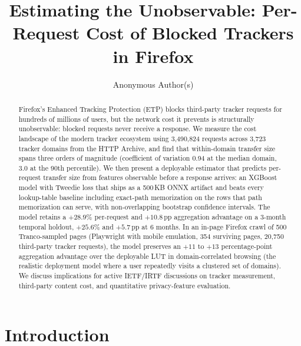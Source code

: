 \documentclass[10pt,sigconf,letterpaper,anonymous]{acmart}
\newcommand{\numrequests}{3{,}490{,}824\xspace}
\newcommand{\numdomains}{3{,}723\xspace}
\begin{document}
\title{Estimating the Unobservable: Per-Request Cost of Blocked Trackers in Firefox}

\author{Anonymous Author(s)}

\begin{abstract}

Firefox's Enhanced Tracking Protection (ETP) blocks third-party tracker requests for hundreds of millions of users, but the network cost it prevents is structurally unobservable: blocked requests never receive a response.
We measure the cost landscape of the modern tracker ecosystem using \numrequests requests across \numdomains tracker domains from the HTTP Archive, and find that within-domain transfer size spans three orders of magnitude (coefficient of variation 0.94 at the median domain, 3.0 at the 90th percentile).
We then present a deployable estimator that predicts per-request transfer size from features observable before a response arrives: an XGBoost model with Tweedie loss that ships as a 500\,KB ONNX artifact and beats every lookup-table baseline including exact-path memorization on the rows that path memorization can serve, with non-overlapping bootstrap confidence intervals.
The model retains a $+28.9\%$ per-request and $+10.8$\,pp aggregation advantage on a 3-month temporal holdout, $+25.6\%$ and $+5.7$\,pp at 6 months. In an in-page Firefox crawl of 500 Tranco-sampled pages (Playwright with mobile emulation, 354 surviving pages, 20{,}750 third-party tracker requests), the model preserves an $+11$ to $+13$ percentage-point aggregation advantage over the deployable LUT in domain-correlated browsing (the realistic deployment model where a user repeatedly visits a clustered set of domains).
We discuss implications for active IETF/IRTF discussions on tracker measurement, third-party content cost, and quantitative privacy-feature evaluation.

\end{abstract}

\maketitle

\section{Introduction}
\label{sec:intro}
\end{document}
